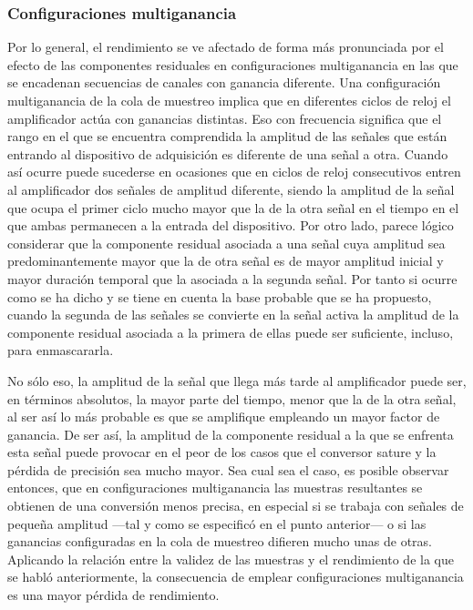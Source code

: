 \subsubsection{Configuraciones multiganancia}

Por lo general, el rendimiento se ve afectado de forma más pronunciada por el efecto de las componentes residuales en configuraciones multiganancia en las que se encadenan secuencias de canales con ganancia diferente. Una configuración multiganancia de la cola de muestreo implica que en diferentes ciclos de reloj el amplificador actúa con ganancias distintas. Eso con frecuencia significa que el rango en el que se encuentra comprendida la amplitud de las señales que están entrando al dispositivo de adquisición es diferente de una señal a otra. Cuando así ocurre puede sucederse en ocasiones que en ciclos de reloj consecutivos entren al amplificador dos señales de amplitud diferente, siendo la amplitud de la señal que ocupa el primer ciclo mucho mayor que la de la otra señal en el tiempo en el que ambas permanecen a la entrada del dispositivo. Por otro lado, parece lógico considerar que la componente residual asociada a una señal cuya amplitud sea predominantemente mayor que la de otra señal es de mayor amplitud inicial y mayor duración temporal que la asociada a la segunda señal. Por tanto si ocurre como se ha dicho y se tiene en cuenta la base probable que se ha propuesto, cuando la segunda de las señales se convierte en la señal activa la amplitud de la componente residual asociada a la primera de ellas puede ser suficiente, incluso, para enmascararla.\par
No sólo eso, la amplitud de la señal que llega más tarde al amplificador puede ser, en términos absolutos, la mayor parte del tiempo, menor que la de la otra señal, al ser así lo más probable es que se amplifique empleando un mayor factor de ganancia. De ser así, la amplitud de la componente residual a la que se enfrenta esta señal puede provocar en el peor de los casos que el conversor sature y la pérdida de precisión sea mucho mayor. Sea cual sea el caso, es posible observar entonces, que en configuraciones multiganancia las muestras resultantes se obtienen de una conversión menos precisa, en especial si se trabaja con señales de pequeña amplitud ---tal y como se especificó en el punto anterior--- o si las ganancias configuradas en la cola de muestreo difieren mucho unas de otras. Aplicando la relación entre la validez de las muestras y el rendimiento de la que se habló anteriormente, la consecuencia de emplear configuraciones multiganancia es una mayor pérdida de rendimiento.


